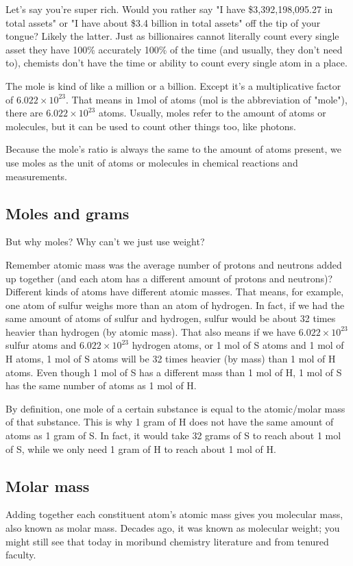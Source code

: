 \documentclass[letterpaper, 12pt]{article}
\begin{document}
Let's say you're super rich. Would you rather say "I have \$3,392,198,095.27 in total assets" or "I have about \$3.4 billion in total assets" off the tip of your tongue? Likely the latter. Just as billionaires cannot literally count every single asset they have 100\% accurately 100\% of the time (and usually, they don't need to), chemists don't have the time or ability to count every single atom in a place.

The mole is kind of like a million or a billion. Except it's a multiplicative factor of $6.022 \times 10^{23}$. That means in $1 \text{mol}$ of atoms (mol is the abbreviation of "mole"), there are $6.022 \times 10^{23}$ atoms. Usually, moles refer to the amount of atoms or molecules, but it can be used to count other things too, like photons.

Because the mole's ratio is always the same to the amount of atoms present, we use moles as the unit of atoms or molecules in chemical reactions and measurements.

	\subsection{Moles and grams}
	But why moles? Why can't we just use weight?
	
	Remember atomic mass was the average number of protons and neutrons added up together (and each atom has a different amount of protons and neutrons)? Different kinds of atoms have different atomic masses. That means, for example, one atom of sulfur weighs more than an atom of hydrogen. In fact, if we had the same amount of atoms of sulfur and hydrogen, sulfur would be about 32 times heavier than hydrogen (by atomic mass). That also means if we have $6.022 \times 10^{23}$ sulfur atoms and $6.022 \times 10^{23}$ hydrogen atoms, or 1 mol of S atoms and 1 mol of H atoms, 1 mol of S atoms will be 32 times heavier (by mass) than 1 mol of H atoms. Even though 1 mol of S has a different mass than 1 mol of H, 1 mol of S has the same number of atoms as 1 mol of H.
	
	By definition, one mole of a certain substance is equal to the atomic/molar mass of that substance. This is why 1 gram of H does not have the same amount of atoms as 1 gram of S. In fact, it would take 32 grams of S to reach about 1 mol of S, while we only need 1 gram of H to reach about 1 mol of H.

	\subsection{Molar mass}
	Adding together each constituent atom's atomic mass gives you molecular mass, also known as molar mass. Decades ago, it was known as molecular weight; you might still see that today in moribund chemistry literature and from tenured faculty.
\end{document}
